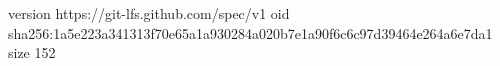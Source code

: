 version https://git-lfs.github.com/spec/v1
oid sha256:1a5e223a341313f70e65a1a930284a020b7e1a90f6c6c97d39464e264a6e7da1
size 152
